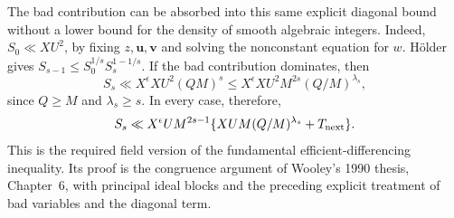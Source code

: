 \documentclass[11pt]{amsart}
\theoremstyle{definition}
\numberwithin{equation}{section}
\begin{document}
The bad contribution can be absorbed into this same explicit diagonal bound
without a lower bound for the density of smooth algebraic integers.
Indeed, $S_0\ll XU^2$, by fixing $z,\mathbf u,\mathbf v$ and solving the
nonconstant equation for $w$.  H\"older gives
$S_{s-1}\le S_0^{1/s}S_s^{1-1/s}$.
If the bad contribution dominates, then
\[
 S_s\ll X^\epsilon XU^2(QM)^s
 \le X^\epsilon XU^2M^{2s}(Q/M)^{\lambda_s},
\]
since $Q\ge M$ and $\lambda_s\ge s$.
In every case, therefore,
\begin{equation}\label{eq:g6-fundamental}
 S_s\ll X^\epsilon U M^{2s-1}
 \{XUM(Q/M)^{\lambda_s}+T_{\rm next}\}.
\end{equation}
This is the required field version of the fundamental efficient-differencing
inequality.  Its proof is the congruence argument of Wooley's 1990 thesis,
Chapter~6, with principal ideal blocks and the preceding explicit treatment
of bad variables and the diagonal term.
\end{document}
